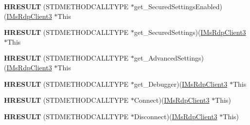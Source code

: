\begin{DoxyCompactItemize}
\item 
\mbox{\label{struct_m_s_t_s_c_lib_1_1_i_ms_rdp_client3_vtbl_a16c749fa17c1b9aeb1e019d0c3be29ed}} 
{\bfseries H\+R\+E\+S\+U\+LT} (S\+T\+D\+M\+E\+T\+H\+O\+D\+C\+A\+L\+L\+T\+Y\+PE $\ast$get\+\_\+\+Secured\+Settings\+Enabled)(\hyperlink{interface_m_s_t_s_c_lib_1_1_i_ms_rdp_client3}{I\+Ms\+Rdp\+Client3} $\ast$This
\item 
\mbox{\label{struct_m_s_t_s_c_lib_1_1_i_ms_rdp_client3_vtbl_adf4e68318aa8e23b0aba76d4c719c188}} 
{\bfseries H\+R\+E\+S\+U\+LT} (S\+T\+D\+M\+E\+T\+H\+O\+D\+C\+A\+L\+L\+T\+Y\+PE $\ast$get\+\_\+\+Secured\+Settings)(\hyperlink{interface_m_s_t_s_c_lib_1_1_i_ms_rdp_client3}{I\+Ms\+Rdp\+Client3} $\ast$This
\item 
\mbox{\label{struct_m_s_t_s_c_lib_1_1_i_ms_rdp_client3_vtbl_a5020cdbf61d600fa9944f415701558cf}} 
{\bfseries H\+R\+E\+S\+U\+LT} (S\+T\+D\+M\+E\+T\+H\+O\+D\+C\+A\+L\+L\+T\+Y\+PE $\ast$get\+\_\+\+Advanced\+Settings)(\hyperlink{interface_m_s_t_s_c_lib_1_1_i_ms_rdp_client3}{I\+Ms\+Rdp\+Client3} $\ast$This
\item 
\mbox{\label{struct_m_s_t_s_c_lib_1_1_i_ms_rdp_client3_vtbl_a7bb4ae11a43ce66efc732fa05c6c8f82}} 
{\bfseries H\+R\+E\+S\+U\+LT} (S\+T\+D\+M\+E\+T\+H\+O\+D\+C\+A\+L\+L\+T\+Y\+PE $\ast$get\+\_\+\+Debugger)(\hyperlink{interface_m_s_t_s_c_lib_1_1_i_ms_rdp_client3}{I\+Ms\+Rdp\+Client3} $\ast$This
\item 
\mbox{\label{struct_m_s_t_s_c_lib_1_1_i_ms_rdp_client3_vtbl_a84acde8725e1d88e8f377f8a3eb61982}} 
{\bfseries H\+R\+E\+S\+U\+LT} (S\+T\+D\+M\+E\+T\+H\+O\+D\+C\+A\+L\+L\+T\+Y\+PE $\ast$Connect)(\hyperlink{interface_m_s_t_s_c_lib_1_1_i_ms_rdp_client3}{I\+Ms\+Rdp\+Client3} $\ast$This)
\item 
\mbox{\label{struct_m_s_t_s_c_lib_1_1_i_ms_rdp_client3_vtbl_a30bed44a28396035c8e97bd80f923373}} 
{\bfseries H\+R\+E\+S\+U\+LT} (S\+T\+D\+M\+E\+T\+H\+O\+D\+C\+A\+L\+L\+T\+Y\+PE $\ast$Disconnect)(\hyperlink{interface_m_s_t_s_c_lib_1_1_i_ms_rdp_client3}{I\+Ms\+Rdp\+Client3} $\ast$This)

\end{DoxyCompactItemize}
